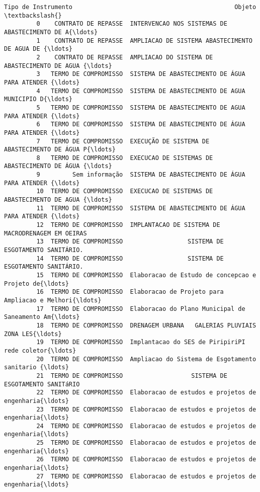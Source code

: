 \documentclass[11pt]{article}
\begin{document}
\begin{Verbatim}[commandchars=\\\{\}]
              Tipo de Instrumento                                             Objeto  \textbackslash{}
         0    CONTRATO DE REPASSE  INTERVENCAO NOS SISTEMAS DE ABASTECIMENTO DE A{\ldots}   
         1    CONTRATO DE REPASSE  AMPLIACAO DE SISTEMA ABASTECIMENTO DE AGUA DE {\ldots}   
         2    CONTRATO DE REPASSE  AMPLIACAO DO SISTEMA DE ABASTECIMENTO DE AGUA {\ldots}   
         3   TERMO DE COMPROMISSO  SISTEMA DE ABASTECIMENTO DE ÁGUA PARA ATENDER {\ldots}   
         4   TERMO DE COMPROMISSO  SISTEMA DE ABASTECIMENTO DE AGUA   MUNICIPIO D{\ldots}   
         5   TERMO DE COMPROMISSO  SISTEMA DE ABASTECIMENTO DE AGUA PARA ATENDER {\ldots}   
         6   TERMO DE COMPROMISSO  SISTEMA DE ABASTECIMENTO DE ÁGUA PARA ATENDER {\ldots}   
         7   TERMO DE COMPROMISSO  EXECUÇÃO DE SISTEMA DE ABASTECIMENTO DE ÁGUA P{\ldots}   
         8   TERMO DE COMPROMISSO  EXECUCAO DE SISTEMAS DE ABASTECIMENTO DE ÁGUA {\ldots}   
         9         Sem informação  SISTEMA DE ABASTECIMENTO DE ÁGUA PARA ATENDER {\ldots}   
         10  TERMO DE COMPROMISSO  EXECUCAO DE SISTEMAS DE ABASTECIMENTO DE AGUA {\ldots}   
         11  TERMO DE COMPROMISSO  SISTEMA DE ABASTECIMENTO DE ÁGUA PARA ATENDER {\ldots}   
         12  TERMO DE COMPROMISSO  IMPLANTACAO DE SISTEMA DE MACRODRENAGEM EM OEIRAS   
         13  TERMO DE COMPROMISSO                  SISTEMA DE ESGOTAMENTO SANITÁRIO.   
         14  TERMO DE COMPROMISSO                  SISTEMA DE ESGOTAMENTO SANITÁRIO.   
         15  TERMO DE COMPROMISSO  Elaboracao de Estudo de concepcao e Projeto de{\ldots}   
         16  TERMO DE COMPROMISSO  Elaboracao de Projeto para Ampliacao e Melhori{\ldots}   
         17  TERMO DE COMPROMISSO  Elaboracao do Plano Municipal de Saneamento Am{\ldots}   
         18  TERMO DE COMPROMISSO  DRENAGEM URBANA   GALERIAS PLUVIAIS   ZONA LES{\ldots}   
         19  TERMO DE COMPROMISSO  Implantacao do SES de PiripiriPI  rede coletor{\ldots}   
         20  TERMO DE COMPROMISSO  Ampliacao do Sistema de Esgotamento sanitario {\ldots}   
         21  TERMO DE COMPROMISSO                   SISTEMA DE ESGOTAMENTO SANITáRIO   
         22  TERMO DE COMPROMISSO  Elaboracao de estudos e projetos de engenharia{\ldots}   
         23  TERMO DE COMPROMISSO  Elaboracao de estudos e projetos de engenharia{\ldots}   
         24  TERMO DE COMPROMISSO  Elaboracao de estudos e projetos de engenharia{\ldots}   
         25  TERMO DE COMPROMISSO  Elaboracao de estudos e projetos de engenharia{\ldots}   
         26  TERMO DE COMPROMISSO  Elaboracao de estudos e projetos de engenharia{\ldots}   
         27  TERMO DE COMPROMISSO  Elaboracao de estudos e projetos de engenharia{\ldots}   

\end{Verbatim}
\end{document}
